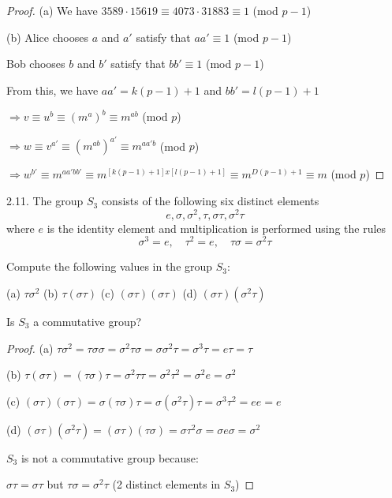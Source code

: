\begin{proof}

(a) We have $3589 \cdot 15619 \equiv 4073 \cdot 31883 \equiv 1$ (mod $p-1$)

(b) Alice chooses $a$ and $a'$ satisfy that $aa' \equiv 1$ (mod $p-1$)

Bob chooses $b$ and $b'$ satisfy that $bb' \equiv 1$ (mod $p-1$)

From this, we have $aa' = k(p-1)+1$ and $bb' = l(p-1) + 1$

$\Rightarrow v \equiv u^b \equiv (m^a)^b \equiv m^{ab}$ (mod $p$)

$\Rightarrow w \equiv v^{a'} \equiv (m^{ab})^{a'} \equiv m^{aa'b}$ (mod $p$)

$\Rightarrow w^{b'} \equiv m^{aa'bb'} \equiv m^{[k(p-1)+1]x[l(p-1)+1]} \equiv m^{D(p-1)+1} \equiv m$ (mod $p$)
\end{proof}

2.11. The group $S_3$ consists of the following six distinct elements
\begin{equation*}
    e, \sigma, \sigma^2, \tau, \sigma\tau, \sigma^2\tau
\end{equation*}
where $e$ is the identity element and multiplication is performed using the rules
\begin{equation*}
    \sigma^3 = e, \quad \tau^2 = e, \quad \tau\sigma = \sigma^2\tau
\end{equation*}

Compute the following values in the group $S_3$:

(a)  $\tau\sigma^2$ \quad\quad (b)  $\tau(\sigma\tau)$ \quad\quad (c)  $(\sigma\tau)(\sigma\tau)$ \quad\quad (d)  $(\sigma\tau)(\sigma^2\tau)$

Is $S_3$ a commutative group?

\begin{proof}
(a) $\tau\sigma^2 = \tau\sigma\sigma = \sigma^2\tau\sigma = \sigma\sigma^2\tau = \sigma^3\tau = e\tau = \tau$

(b) $\tau(\sigma\tau)=(\tau\sigma)\tau = \sigma^2\tau\tau = \sigma^2\tau^2 = \sigma^2e = \sigma^2$

(c) $(\sigma\tau)(\sigma\tau) = \sigma(\tau\sigma)\tau=\sigma(\sigma^2\tau)\tau=\sigma^3\tau^2=ee=e$

(d) $(\sigma\tau)(\sigma^2\tau)=(\sigma\tau)(\tau\sigma)=\sigma\tau^2\sigma=\sigma e \sigma = \sigma^2$

$S_3$ is not a commutative group because:

$\sigma\tau = \sigma\tau$ but $\tau\sigma = \sigma^2\tau$ (2 distinct elements in $S_3$)
\end{proof}


